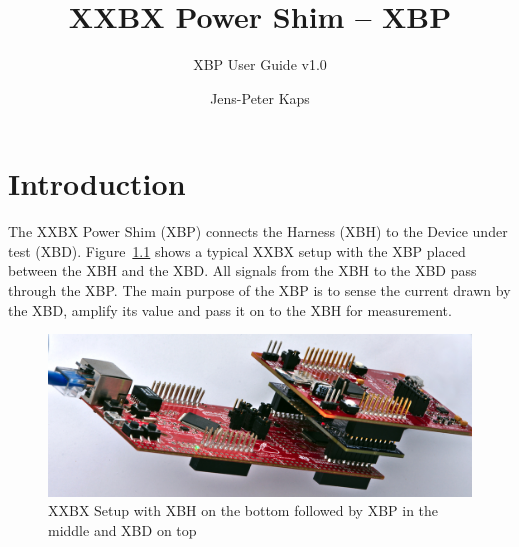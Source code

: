 \documentclass[twoside,11pt]{cergdoc}
\begin{document}
\title{XXBX Power Shim -- XBP}
\subtitle{XBP User Guide v1.0}
\author{Jens-Peter Kaps}

\maketitle

\tableofcontents

\chapter{Introduction}
The XXBX Power Shim (XBP) connects the Harness (XBH) to the Device under test (XBD). Figure~\ref{fig:xxbxsetup}
shows a typical XXBX setup with the XBP placed between the XBH and the XBD. All signals from the 
XBH to the XBD pass through the XBP. The main purpose of the XBP is to sense the current 
drawn by the XBD, amplify its value and pass it on to the XBH for measurement. 

\begin{figure}[ht]
  \begin{center}
    \includegraphics[scale=1]{figures/xxbx-side}
    \caption{XXBX Setup with XBH on the bottom followed by XBP in the middle and XBD on top}\label{fig:xxbxsetup}
  \end{center}
\end{figure}
\end{document}
